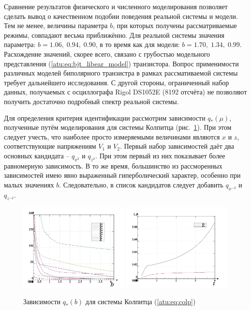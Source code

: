 Сравнение результатов физического и численного моделирования позволяет сделать вывод
о качественном подобии поведения реальной системы и модели.
Тем не менее, величины параметра $b$, при которых получены
рассматриваемые режимы, совпадают весьма приближённо.
Для реальной системы значения параметра: $b = 1.06, \; 0.94, \; 0.90 $, в то время как
для модели: $b = 1.70, \; 1.34, \; 0.99 $.
Расхождение значений, скорее всего, связано с грубостью модельного представления (\ref{atu:eq:bjt_libear_model}) транзистора.
Вопрос применимости различных моделей биполярного транзистра в рамках рассмативаемой системы
требует дальнейшего исследования.
С другой стороны, ограниченный набор данных, получаемых с осциллографа Rigol DS1052E (8192 отсчёта) не позволяют
получить достаточно подробный спектр реальной системы.

Для определения критерия идентификации рассмотрим зависимости
$q_{*}(\mu) $, полученные путём моделирования
для системы Колпитца (рис.~\ref{atu:f:colp_q}).
При этом следует учесть, что наиболее просто измеряемыми величинами являются $x$ и $z$,
соответствующие напряжениям $V_1$ и $V_2$.
Первый набор зависимостей даёт два основных кандидата -- $q_{x^2}$ и $q_{z^2}$.
При этом первый из них показывает более равномерную зависимость.
В то же время, большинство из рассморенных зависимостей имею явно
выраженный гиперболический характер, особенно при малых значениях $b$.
Следовательно, в список кандидатов следует добавить $q_{x^{-2}} $ и $q_{z^{-2}}$.

\begin{figure}[htb!]
\centerline{
  \includegraphics[width=0.49\textwidth]{p/cha/colp/colp_p-p_b_e.png}
  \includegraphics[width=0.49\textwidth]{p/cha/colp/colp_p-p_b_1ex2.png}
}
  \caption{Зависимости $q_{*}(b) $ для системы Колпитца (\ref{atu:eq:colp})}
\label{atu:f:colp_q}
\end{figure}

